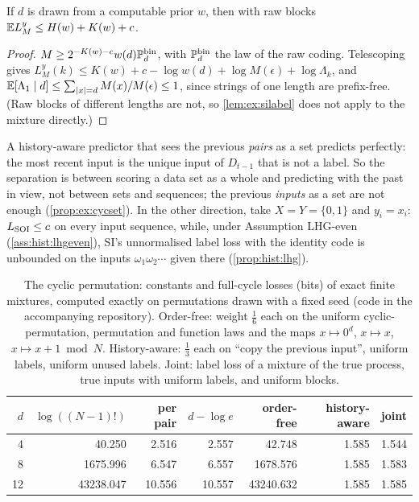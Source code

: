 \begin{remark}\label{rem:ex:prior}
If $d$ is drawn from a computable prior $w$, then with raw blocks $\mathbb{E} L^y_M\le H(w)+K(w)+c$.
\end{remark}

\begin{proof}
$M\ge2^{-K(w)-c}w(d)\mathbb{P}^{\rm bin}_d$, with $\mathbb{P}^{\rm bin}_d$ the law of the raw coding. Telescoping gives $L^y_M(k)\le K(w)+c-\log w(d)+\log M(\epsilon)+\log\Lambda_k$, and $\mathbb{E}[\Lambda_1\mid d]\le\sum_{|x|=d}M(x)/M(\epsilon)\le1$, since strings of one length are prefix-free. (Raw blocks of different lengths are not, so \cref{lem:ex:silabel} does not apply to the mixture directly.)
\end{proof}

\begin{remark}\label{rem:ex:where}
A history-aware predictor that sees the previous \emph{pairs} as a set predicts perfectly: the most recent input is the unique input of $D_{t-1}$ that is not a label. So the separation is between scoring a data set as a whole and predicting with the past in view, not between sets and sequences; the previous \emph{inputs} as a set are not enough (\cref{prop:ex:cycset}). In the other direction, take $X=Y=\{0,1\}$ and $y_i=x_i$: $L_{\mathrm{SOI}}\le c$ on every input sequence, while, under Assumption LHG-even (\cref{ass:hist:lhgeven}), SI's unnormalised label loss with the identity code is unbounded on the inputs $\omega_1\omega_2\cdots$ given there (\cref{prop:hist:lhg}).
\end{remark}

\begin{table}[t]
\centering\small
\begin{tabular}{rrrrrrr}
\toprule
$d$ & $\log((N-1)!)$ & per pair & $d-\log e$ & order-free & history-aware & joint\\
\midrule
4 & 40.250 & 2.516 & 2.557 & 42.748 & 1.585 & 1.544\\
8 & 1675.996 & 6.547 & 6.557 & 1678.576 & 1.585 & 1.583\\
12 & 43238.047 & 10.556 & 10.557 & 43240.632 & 1.585 & 1.585\\
\bottomrule
\end{tabular}

\caption[The cyclic permutation: constants and finite mixtures]{The cyclic permutation: constants and full-cycle losses (bits) of exact finite mixtures, computed exactly on permutations drawn with a fixed seed (code in the accompanying repository). Order-free: weight $\frac16$ each on the uniform cyclic-permutation, permutation and function laws and the maps $x\mapsto0^d$, $x\mapsto x$, $x\mapsto x+1\bmod N$. History-aware: $\frac13$ each on ``copy the previous input'', uniform labels, uniform unused labels. Joint: label loss of a mixture of the true process, true inputs with uniform labels, and uniform blocks.}\label{tab:ex:cycle}
\end{table}

